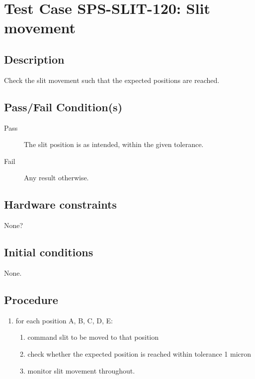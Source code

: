 \section{Test Case SPS-SLIT-120: Slit movement}

\subsection{Description}

Check the slit movement such that the expected positions are reached.

\subsection{Pass/Fail Condition(s)}

\begin{description}
\item [Pass] The slit position is as intended, within the given tolerance.
\item [Fail] Any result otherwise. 
\end{description}

\subsection{Hardware constraints}

None?

\subsection{Initial conditions}

None.

\subsection{Procedure}

\begin{enumerate}
    \item for each position A, B, C, D, E:
    \begin{enumerate}
        \item command slit to be moved to that position
        \item check whether the expected position is reached within tolerance 1 micron
        \item monitor slit movement throughout.
    \end{enumerate}
\end{enumerate}

